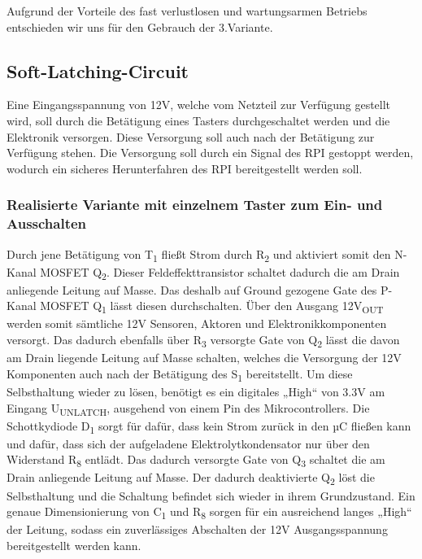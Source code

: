 Aufgrund der Vorteile des fast verlustlosen und wartungsarmen Betriebs entschieden wir uns für den Gebrauch der 3.Variante.

\newpage
\subsection{Soft-Latching-Circuit}

Eine Eingangsspannung von 12V, welche vom Netzteil zur Verfügung gestellt wird, soll durch die Betätigung eines Tasters durchgeschaltet werden und die Elektronik versorgen.
Diese Versorgung soll auch nach der Betätigung zur Verfügung stehen.
Die Versorgung soll durch ein Signal des RPI gestoppt werden, wodurch ein sicheres Herunterfahren des RPI bereitgestellt werden soll.

\subsubsection{Realisierte Variante mit einzelnem Taster zum Ein- und Ausschalten}

Durch jene Betätigung von T\textsubscript{1} fließt Strom durch R\textsubscript{2} und aktiviert somit den N-Kanal MOSFET Q\textsubscript{2}.
Dieser Feldeffekttransistor schaltet dadurch die am Drain anliegende Leitung auf Masse.
Das deshalb auf Ground gezogene Gate des P-Kanal MOSFET Q\textsubscript{1} lässt diesen durchschalten.
Über den Ausgang 12V\textsubscript{OUT} werden somit sämtliche 12V Sensoren, Aktoren und Elektronikkomponenten versorgt.
Das dadurch ebenfalls über R\textsubscript{3} versorgte Gate von Q\textsubscript{2} lässt die davon am Drain liegende Leitung auf Masse schalten,
welches die Versorgung der 12V Komponenten auch nach der Betätigung des S\textsubscript{1} bereitstellt.
Um diese Selbsthaltung wieder zu lösen, benötigt es ein digitales „High“ von 3.3V am Eingang U\textsubscript{UNLATCH}, ausgehend von einem Pin des Mikrocontrollers.
Die Schottkydiode D\textsubscript{1} sorgt für dafür, dass kein Strom zurück in den µC fließen kann und dafür,
dass sich der aufgeladene Elektrolytkondensator nur über den Widerstand R\textsubscript{8} entlädt.
Das dadurch versorgte Gate von Q\textsubscript{3} schaltet die am Drain anliegende Leitung auf Masse.
Der dadurch deaktivierte Q\textsubscript{2} löst die Selbsthaltung und die Schaltung befindet sich wieder in ihrem Grundzustand.
Ein genaue Dimensionierung von C\textsubscript{1} und R\textsubscript{8} sorgen für ein ausreichend langes „High“ der Leitung,
sodass ein zuverlässiges Abschalten der 12V Ausgangsspannung bereitgestellt werden kann. \\

